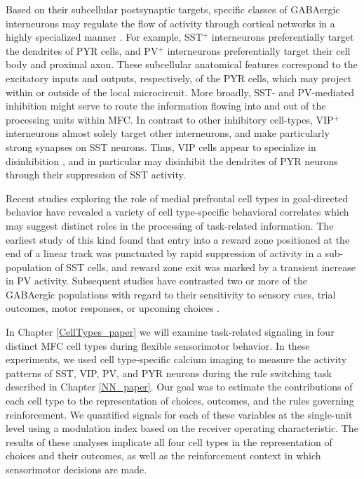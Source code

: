 Based on their subcellular postsynaptic targets, specific classes of GABAergic interneurons may regulate the flow of activity through cortical networks in a highly specialized manner \citep{kepecs2014interneuron}. For example, SST$^+$ interneurons preferentially target the dendrites of PYR cells, and PV$^+$ interneurons preferentially target their cell body and proximal axon. These subcellular anatomical features correspond to the excitatory inputs and outputs, respectively, of the PYR cells, which may project within or outside of the local microcircuit. More broadly, SST- and PV-mediated inhibition might serve to route the information flowing into and out of the processing units within MFC. In contrast to other inhibitory cell-types, VIP$^+$ interneurons almost solely target other interneurons, and make particularly strong synapses on SST neurons. Thus, VIP cells appear to specialize in disinhibition \citep{letzkus2011disinhibitory,pi13,karnani2016opening}, and in particular may disinhibit the dendrites of PYR neurons through their suppression of SST activity.

Recent studies exploring the role of medial prefrontal cell types in goal-directed behavior have revealed a variety of cell type-specific behavioral correlates which may suggest distinct roles in the processing of task-related information. The earliest study of this kind \citep{kvitsiani2013distinct} found that entry into a reward zone positioned at the end of a linear track was punctuated by rapid suppression of activity in a sub-population of SST cells, and reward zone exit was marked by a transient increase in PV activity. Subsequent studies have contrasted two or more of the GABAergic populations with regard to their sensitivity to sensory cues, trial outcomes, motor responses, or upcoming choices \citep{pinto2015cell,kim2016distinct}.

In Chapter \ref{CellTypes_paper} we will examine task-related signaling in four distinct MFC cell types during flexible sensorimotor behavior. In these experiments, we used cell type-specific calcium imaging to measure the activity patterns of SST, VIP, PV, and PYR neurons during the rule switching task described in Chapter \ref{NN_paper}. Our goal was to estimate the contributions of each cell type to the representation of choices, outcomes, and the rules governing reinforcement. We quantified signals for each of these variables at the single-unit level using a modulation index based on the receiver operating characteristic. The results of these analyses implicate all four cell types in the representation of choices and their outcomes, as well as the reinforcement context in which sensorimotor decisions are made. 